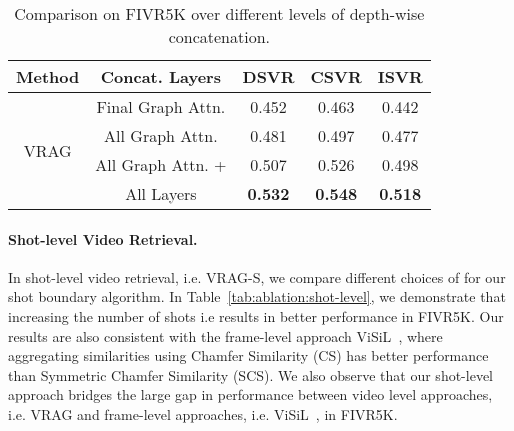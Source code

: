 \documentclass[letterpaper]{article} \usepackage{aaai22}  \usepackage{times}  \usepackage{helvet}  \usepackage{courier}  \usepackage[hyphens]{url}  \usepackage{graphicx} \urlstyle{rm} \usepackage{amsmath}
\begin{document}
\begin{table}[ht]
    \centering
    \begin{tabular}{|c|c|c|c|c|}
    \hline
         Method & Concat. Layers & DSVR & CSVR & ISVR \\
         \hline\hline
         \multirow{4}{*}{VRAG} & Final Graph Attn. & 0.452 & 0.463 & 0.442 \\
        \cline{2-5}
         & All Graph Attn. & 0.481 & 0.497 & 0.477 \\
        \cline{2-5}
         & All Graph Attn. +  & 0.507 & 0.526 & 0.498 \\
        \cline{2-5}
         &  All Layers & \textbf{0.532} & \textbf{0.548} & \textbf{0.518} \\
         \hline
    \end{tabular}
    \caption{Comparison on FIVR5K over different levels of depth-wise concatenation.}
    \label{tab:ablation:region-embed}
\end{table}

\paragraph{Shot-level Video Retrieval.}
In shot-level video retrieval, i.e. VRAG-S, we compare different choices of  for our shot boundary algorithm. In Table~\ref{tab:ablation:shot-level}, we demonstrate that increasing the number of shots i.e  results in better performance in FIVR5K. Our results are also consistent with the frame-level approach ViSiL~\cite{kordopatiszilos2019visil}, where aggregating similarities using Chamfer Similarity (CS) has better performance than Symmetric Chamfer Similarity (SCS). We also observe that our shot-level approach bridges the large gap in performance between video level approaches, i.e. VRAG and frame-level approaches, i.e. ViSiL~\cite{kordopatiszilos2019visil}, in FIVR5K.
\end{document}
